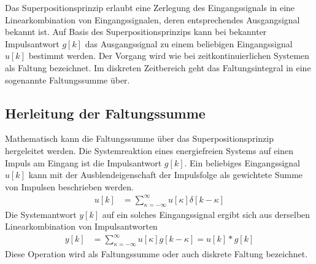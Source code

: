 Das Superpositionsprinzip erlaubt eine Zerlegung des Eingangssignals in eine Linearkombination von Eingangssignalen, deren entsprechendes Ausgangsignal bekannt ist. Auf Basis des Superpositionsprinzips kann bei bekannter Impulsantwort \(g[k]\) das Ausgangssignal zu einem beliebigen Eingangssignal \(u[k]\) bestimmt werden. Der Vorgang wird wie bei zeitkontinuierlichen Systemen als Faltung bezeichnet. Im diskreten Zeitbereich geht das Faltungsintegral in eine sogenannte Faltungssumme über.

\subsection{Herleitung der Faltungssumme}\label{sec:herleitung-der-faltungssumme}

Mathematisch kann die Faltungssumme über das Superpositionsprinzip hergeleitet werden. Die Systemreaktion eines energiefreien Systems auf einen Impuls am Eingang ist die Impulsantwort \(g[k]\). Ein beliebiges Eingangssignal \(u[k]\) kann mit der Ausblendeigenschaft der Impulsfolge als gewichtete Summe von Impulsen beschrieben werden.
\begin{align}
u[ k] &= \sum\limits_{\kappa = - \infty}^{\infty}{u[\kappa]  \delta[ k - \kappa]} \label{eq:4.85}
\end{align}
Die Systemantwort \(y[k]\) auf ein solches Eingangssignal ergibt sich aus derselben Linearkombination von Impulsantworten
\begin{align}
y[ k] &= \sum\limits_{\kappa = - \infty}^{\infty}{u[\kappa]  g[ k - \kappa]} = u[ k]*g[ k] \label{eq:4.86}
\end{align}
Diese Operation wird als Faltungssumme oder auch diskrete Faltung bezeichnet.


